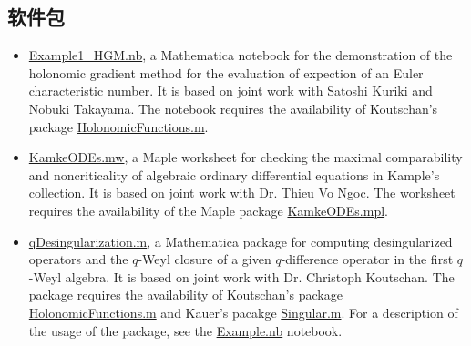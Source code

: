\documentclass[a4paper,12pt]{article}
\begin{document}
\begin{CJK*}{UTF8}{gbsn}

\section*{\Large{软件包}}
\begin{itemize}
\item \href{https://yzhang1616.github.io/ec1/Example1_HGM.nb}{Example1\_HGM.nb}, a Mathematica notebook for
    the demonstration of the holonomic gradient method for the evaluation of
    expection of an Euler characteristic number. It is based on joint work
    with Satoshi Kuriki and Nobuki Takayama. 
    The notebook requires the availability of Koutschan's package 
     \href{http://www.risc.jku.at/research/combinat/software/ergosum/RISC/HolonomicFunctions.html}{HolonomicFunctions.m}.
 \item \href{https://yzhang1616.github.io/KamkeODEs.mw}{KamkeODEs.mw}, a Maple worksheet for 
     checking the maximal comparability and noncriticality of algebraic
     ordinary differential equations in
     Kample's collection. It is based on joint work with Dr. Thieu Vo Ngoc. 
     The worksheet requires the availability of the Maple package \href{https://yzhang1616.github.io/KamkeODEs.mpl}{KamkeODEs.mpl}.
 \item \href{https://yzhang1616.github.io/qDesingularization.m}{qDesingularization.m}, a Mathematica
     package for computing desingularized operators and the $q$-Weyl closure of
     a given $q$-difference operator in
     the first $q$-Weyl algebra. It is based on joint work with Dr. Christoph
     Koutschan. The package requires the availability of Koutschan's package
     \href{http://www.risc.jku.at/research/combinat/software/ergosum/RISC/HolonomicFunctions.html}{HolonomicFunctions.m}
     and Kauer's pacakge \href{https://www.risc.jku.at/research/combinat/risc/software/Singular/index.html}{Singular.m}.
     For a description of the usage of the package, see the \href{https://yzhang1616.github.io/Example.nb}{Example.nb} notebook.
\end{itemize}


\end{CJK*}
\end{document}
